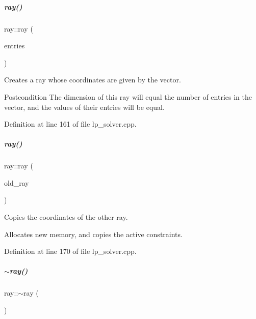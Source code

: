 \mbox{\label{group___c_l_s_solvers_a6387c9c134132709f29770212648c718}} 
\subparagraph{\texorpdfstring{ray()}{ray()}\hspace{0.1cm}{\footnotesize\ttfamily [4/5]}}
{\footnotesize\ttfamily ray\+::ray (\begin{DoxyParamCaption}\item[{const vector$<$ R\+A\+Y\+E\+N\+T\+\_\+\+T\+Y\+PE $>$ \&}]{entries }\end{DoxyParamCaption})}



Creates a ray whose coordinates are given by the vector. 

\begin{DoxyPostcond}{Postcondition}
The dimension of this ray will equal the number of entries in the vector, and the values of their entries will be equal. 
\end{DoxyPostcond}


Definition at line 161 of file lp\+\_\+solver.\+cpp.

\mbox{\label{group___c_l_s_solvers_af4ec5bf395f8b37cb7c4fd7f27999a5d}} 
\subparagraph{\texorpdfstring{ray()}{ray()}\hspace{0.1cm}{\footnotesize\ttfamily [5/5]}}
{\footnotesize\ttfamily ray\+::ray (\begin{DoxyParamCaption}\item[{const \hyperlink{group___c_l_s_solvers_classray}{ray} \&}]{old\+\_\+ray }\end{DoxyParamCaption})}



Copies the coordinates of the other ray. 

Allocates new memory, and copies the active constraints. 

Definition at line 170 of file lp\+\_\+solver.\+cpp.

\mbox{\label{group___c_l_s_solvers_ae29c6b5cecdc32127dc9e5c0141d120d}} 
\subparagraph{\texorpdfstring{$\sim$ray()}{~ray()}}
{\footnotesize\ttfamily ray\+::$\sim$ray (\begin{DoxyParamCaption}{ }\end{DoxyParamCaption})}



